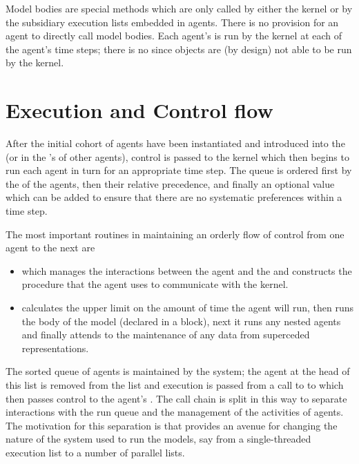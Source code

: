 Model bodies are special methods which are only called by either the
kernel or by the subsidiary execution lists embedded in agents. There
is no provision for an agent to directly call model bodies.  Each
agent's  is run by the kernel at each of the
agent's time steps; there is no  since objects are
(by design) not able to be run by the kernel.

\section{Execution and Control flow}

After the initial cohort of agents have been instantiated and
introduced into the  (or in the
's of other agents), control is passed to
the kernel which then begins to run each agent in turn for an
appropriate time step. The queue is ordered first by the
 of the agents, then their relative precedence, and
finally an optional  value which can be added to ensure that
there are no systematic preferences within a time step.

The most important routines in maintaining an orderly flow of control
from one agent to the next are
\begin{itemize}
\item[\method{run-agent}] which manages the interactions between the
  agent and the  and constructs the procedure that the agent uses
  to communicate with the kernel.

\item[\method{run}] calculates the upper limit on the amount of time the
  agent will run, then runs the body of the model (declared in
  a  block), next it runs any nested agents and
  finally attends to the maintenance of any data from superceded
  representations.
\end{itemize}

The sorted queue of agents is maintained by the system; the agent at
the head of this list is removed from the list and execution is passed
from a call to  to   which then passes
control to the agent's . The call chain is split in
this way to separate interactions with the run queue and the
management of the activities of agents.  The motivation for this
separation is that provides an avenue for changing the nature of the
system used to run the models, say from a single-threaded execution
list to a number of parallel lists.

